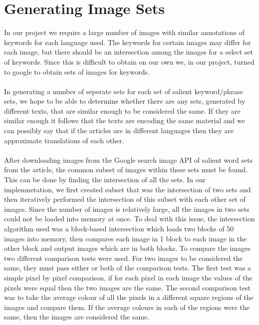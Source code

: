 \documentclass[12pt]{article}
\begin{document}
\section{Generating Image Sets}
In our project we require a large number of images with similar annotations of keywords for each language 
used. The keywords for certain images may differ for each image, but there should be an intersection among 
the images for a select set of keywords. Since this is difficult to obtain on our own we, in our project, 
turned to google to obtain sets of images for keywords.
\paragraph{}
In generating a number of seperate sets for each set of salient keyword/phrase sets, we hope to be able
to determine whether there are any sets, generated by different texts, that are similar enough to be
considered the same. If they are similar enough it follows that the texts are encoding the same material 
and we can possibly say that if the articles are in different languages then they are approximate 
translations of each other.
\paragraph{}
After downloading images from the Google search image API of salient word sets from the article, the common 
subset of images within these sets must be found. This can be done by finding the intersection of all the 
sets. In our implemnetation, we first created subset that was the intersection of two sets and then 
iteratively performed the intersection of this subset with each other set of images. Since the number of 
images is relatively large, all the images in two sets could not be loaded into memory at once. To deal with 
this issue, the intersection algorithm used was a block-based intersection which loads two blocks of 50 images 
into memory, then compares each image in 1 block to each image in the other block and output images which are 
in both blocks. To compare the images two different comparison tests were used. For two images to be considered 
the same, they must pass either or both of the comparison tests. The first test was a simple pixel by pixel 
comparison, if for each pixel in each image the values of the pixels were equal then the two images are the 
same. The second comparison test was to take the average colour of all the pixels in a different square regions 
of the images and compare them. If the average colours in each of the regions were the same, then the images 
are considered the same.
\end{document}
